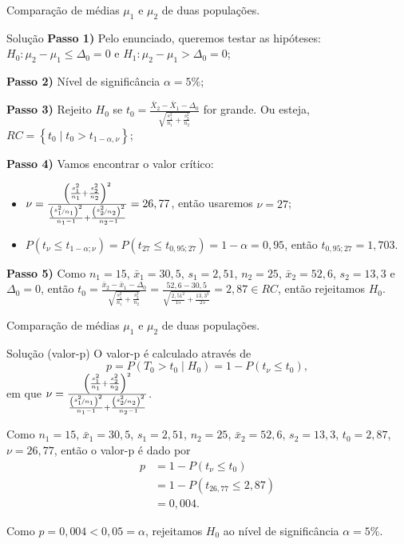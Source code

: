 \documentclass[9pt]{beamer}
\begin{document}
\begin{frame}{Comparação de médias $\mu_1$ e $\mu_2$ de duas populações.}

\begin{block}{Solução}
	\textbf{Passo 1)} Pelo enunciado, queremos testar as hipóteses: $H_0: \mu_2 - \mu_1 \leq \Delta_0 = 0$ e $H_1: \mu_2 - \mu_1 > \Delta_0 = 0$;
	
	\textbf{Passo 2)} Nível de significância $\alpha=5\%$;
	
	\textbf{Passo 3)} Rejeito $H_0$ se $t_0 = \frac{\bar{X}_2 - \bar{X}_1 -\Delta_0}{\sqrt{\frac{s_1^2}{n_1} + \frac{s_2^2}{n_2}}}$ for grande. Ou esteja, $RC = \left\{ t_0 \mid t_0 > t_{1-\alpha, \nu} \right\}$;
	
	\textbf{Passo 4)} Vamos encontrar o valor crítico:
	\begin{itemize}
		\item $\nu = \frac{\left( \frac{s_1^2}{n_1} + \frac{s_2^2}{n_2} \right)^2}{\frac{\left(\nicefrac{s_1^2}{n_1}\right)^2}{n_1-1} + \frac{\left(\nicefrac{s_2^2}{n_2}\right)^2}{n_2-1}} = 26,77$, então usaremos $\nu=27$;
		\item $P(t_\nu \leq t_{1-\alpha;\nu}) = P(t_{27} \leq t_{0,95; 27})= 1-\alpha = 0,95$, então $t_{0,95; 27} = 1,703$.
	\end{itemize}

	\textbf{Passo 5)} Como $n_1=15$, $\bar{x}_1=30,5$, $s_1 = 2,51$, $n_2=25$, $\bar{x}_2 = 52,6$, $s_2 = 13,3$ e $\Delta_0=0$, então $t_0 = \frac{\bar{x}_2 - \bar{x}_1 - \Delta_0}{\sqrt{\frac{s_1^2}{n_1} + \frac{s_2^2}{n_2}}}= \frac{52,6 - 30,5}{\sqrt{\frac{2,51^2}{15} + \frac{13,3^2}{25}}} = 2,87 \in RC$, então rejeitamos $H_0$.
\end{block}
\end{frame}

\begin{frame}{Comparação de médias $\mu_1$ e $\mu_2$ de duas populações.}

\begin{block}{Solução (valor-p)}
	O valor-p é calculado através de
	$$p=P(T_0 > t_0 \mid H_0) = 1 - P(t_\nu \leq t_0),$$
	em que $\nu = \frac{\left( \frac{s_1^2}{n_1} + \frac{s_2^2}{n_2} \right)^2}{\frac{\left(\nicefrac{s_1^2}{n_1}\right)^2}{n_1-1} + \frac{\left(\nicefrac{s_2^2}{n_2}\right)^2}{n_2-1}}$.
	
	Como $n_1 = 15$, $\bar{x}_1 = 30,5$, $s_1=2,51$, $n_2 = 25$, $\bar{x}_2 = 52,6$, $s_2 = 13,3$, $t_0 = 2,87$, $\nu = 26,77$, então o valor-p é dado por
	\begin{align*}
		p &= 1 - P(t_\nu \leq t_0)\\
		&= 1 - P(t_{26,77} \leq 2,87)\\
		&= 0,004.
	\end{align*}
	
	Como $p=0,004 < 0,05 = \alpha$, rejeitamos $H_0$ ao nível de significância $\alpha=5\%$.
\end{block}
\end{frame}
\end{document}
